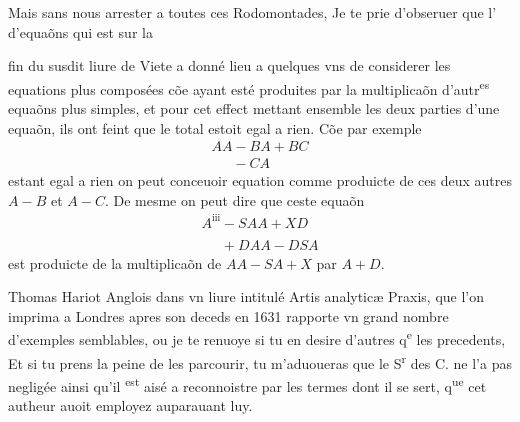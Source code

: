 \documentclass[11pt,a4paper]{article}
\begin{document}
Mais sans nous arrester a toutes ces Rodomontades, Je te prie d'obseruer que l' d'equaõns qui est sur la


fin du susdit liure de Viete a donné lieu a quelques vns de considerer les equations plus composées cõe ayant esté produites par la multiplicaõn d'autr\textsuperscript{es} equaõns plus simples, et pour  cet effect mettant ensemble les deux parties d'une equaõn, ils ont feint que le total estoit egal a rien. Cõe par exemple
\[ \begin{array}{l} AA - BA + BC \\ \phantom{AA} - CA \end{array} \]
estant egal a rien on peut conceuoir  equation comme produicte de ces deux autres $A-B$ et $A-C$. De mesme on peut dire que ceste equaõn
\[ \begin{array}{l} A^{\mathrm{iii}} - SAA + XD \\ \phantom{A^{\mathrm{iii}}} + DAA - DSA \end{array} \]
est produicte de la multiplicaõn de $AA - SA + X$ par $A+D$.

Thomas Hariot Anglois dans vn liure intitulé Artis \struck{\ill{}} analyticæ Praxis, que l'on imprima a Londres apres son deceds en 1631 rapporte vn grand nombre d'exemples semblables, ou je te renuoye si tu en desire d'autres q\textsuperscript{e} les precedents, Et si tu prens la peine de les parcourir, tu m'aduoueras que le S\textsuperscript{r} des C. ne l'a pas negligée ainsi qu'il \textsuperscript{est} aisé a reconnoistre par les termes dont il se sert, q\textsuperscript{ue} cet autheur auoit employez auparauant luy.
\end{document}
